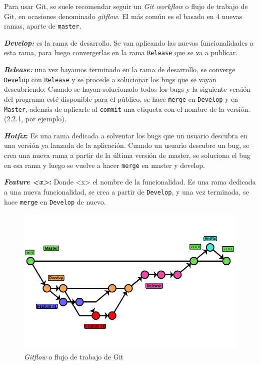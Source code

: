 \documentclass[a4paper, 11pt]{report} %
\begin{document}
Para usar Git, se suele recomendar seguir un \textit{Git workflow} o flujo de trabajo de Git, en ocasiones denominado \textit{gitflow}. El más común es el basado en 4 nuevas ramas, aparte de \texttt{master}.
\begin{description}
\item \textbf{\textit{Develop:}} es la rama de desarrollo. Se van aplicando las nuevas funcionalidades a esta rama, para luego convergerlas en la rama \texttt{Release} que se va a publicar.
\item \textbf{\textit{Release:}} una vez hayamos terminado en la rama de desarrollo, se converge \texttt{Develop} con \texttt{Release} y se procede a solucionar los bugs que se vayan descubriendo. Cuando se hayan solucionado todos los bugs y la siguiente versión del programa esté disponible para el público, se hace \texttt{merge} en \texttt{Develop} y en \texttt{Master}, además de aplicarle al \texttt{commit} una etiqueta con el nombre de la versión. (2.2.1, por ejemplo).
\item \textbf{\textit{Hotfix}:} Es una rama dedicada a solventar los \glspl{bug} que un usuario descubra en una versión ya lanzada de la aplicación. Cuando un usuario descubre un bug, se crea una nueva rama a partir de la última versión de master, se soluciona el bug en esa rama y luego se vuelve a hacer \texttt{merge} en master y develop.
\item \textbf{\textit{Feature <x>}:} Donde <x> el nombre de la funcionalidad. Es una rama dedicada a una nueva funcionalidad, se crea a partir de \texttt{Develop}, y una vez terminada, se hace \texttt{merge} en \texttt{Develop} de nuevo.
\end{description}
\begin{figure}[H]
\noindent
\includegraphics[width=\textwidth]{Resources/Gitflow.png}
\caption{\textit{Gitflow} o flujo de trabajo de Git}
\end{figure}
\end{document}
